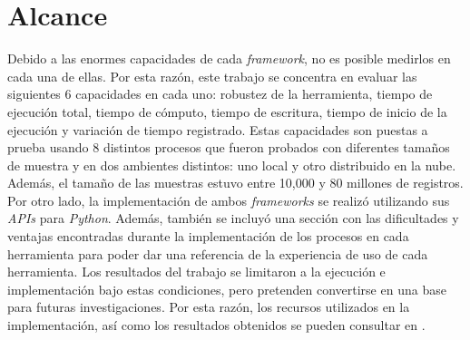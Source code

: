 \section*{Alcance}

Debido a las enormes capacidades de cada \textit{framework}, no es posible medirlos en cada una de ellas. Por esta razón, este trabajo se concentra en evaluar las siguientes 6 capacidades en cada uno: robustez de la herramienta, tiempo de ejecución total, tiempo de cómputo, tiempo de escritura, tiempo de inicio de la ejecución y variación de tiempo registrado. Estas capacidades son puestas a prueba usando 8 distintos procesos que fueron probados con diferentes tamaños de muestra y en dos ambientes distintos: uno local y otro distribuido en la nube. Además, el tamaño de las muestras estuvo entre 10,000 y 80 millones de registros. Por otro lado, la implementación de ambos \textit{frameworks} se realizó utilizando sus \textit{APIs} para \textit{Python}. Además, también se incluyó una sección con las dificultades y ventajas encontradas durante la implementación de los procesos en cada herramienta para poder dar una referencia de la experiencia de uso de cada herramienta. Los resultados del trabajo se limitaron a la ejecución e implementación bajo estas condiciones, pero pretenden convertirse en una base para futuras investigaciones. Por esta razón, los recursos utilizados en la implementación, así como los resultados obtenidos se pueden consultar en \cite{repo-spark-rita}.


